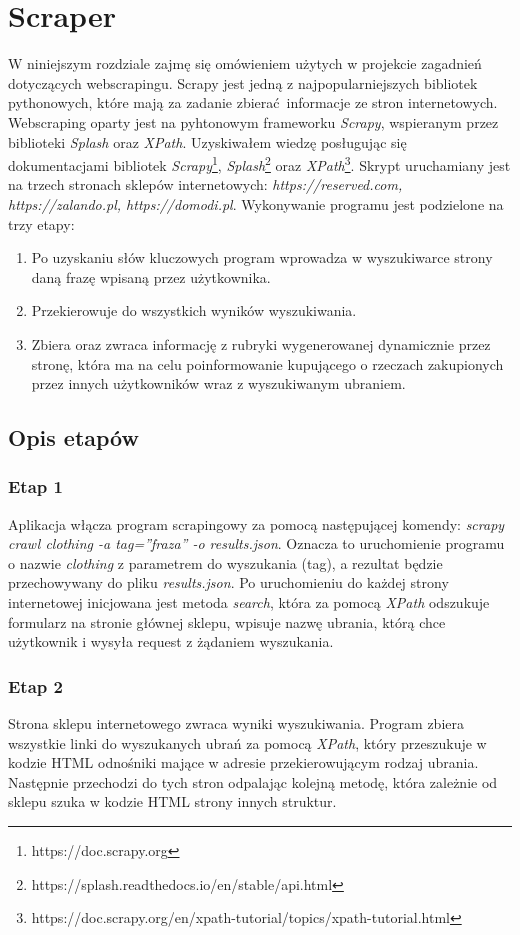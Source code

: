 \chapter {Scraper} 
W niniejszym rozdziale zajmę się omówieniem użytych w projekcie zagadnień dotyczących webscrapingu.
Scrapy jest jedną z najpopularniejszych bibliotek pythonowych, które mają za zadanie zbierać informacje ze stron internetowych.
Webscraping oparty jest na pyhtonowym frameworku \emph{Scrapy}, wspieranym przez biblioteki \emph{Splash} oraz \emph{XPath}.
Uzyskiwałem wiedzę posługując się dokumentacjami bibliotek \emph{Scrapy}\footnote{https://doc.scrapy.org}, \emph{Splash}\footnote{https://splash.readthedocs.io/en/stable/api.html} oraz \emph{XPath}\footnote{https://doc.scrapy.org/en/xpath-tutorial/topics/xpath-tutorial.html}.
Skrypt uruchamiany jest na trzech stronach sklepów internetowych: \emph{https://reserved.com, https://zalando.pl, https://domodi.pl}. 
Wykonywanie programu jest podzielone na trzy etapy:
\begin{enumerate}
	\item Po uzyskaniu słów kluczowych program wprowadza w wyszukiwarce strony daną frazę wpisaną przez użytkownika.
	\item Przekierowuje do wszystkich wyników wyszukiwania.
	\item Zbiera oraz zwraca informację z rubryki wygenerowanej dynamicznie przez stronę, która 	ma na celu poinformowanie kupującego o rzeczach zakupionych przez innych 	użytkowników wraz z wyszukiwanym ubraniem.
\end{enumerate}
\section{Opis etapów}

\subsection{Etap 1}
	Aplikacja włącza program scrapingowy za pomocą następującej komendy: \emph{scrapy crawl clothing -a tag=”fraza” -o results.json}.
Oznacza to uruchomienie programu o nazwie \emph{clothing} z parametrem do wyszukania (tag), a rezultat będzie przechowywany do pliku \emph{results.json}.
Po uruchomieniu do każdej strony internetowej inicjowana jest metoda \emph{search}, która za pomocą \emph{XPath} odszukuje formularz na stronie głównej sklepu, wpisuje nazwę ubrania, którą chce użytkownik i wysyła request z żądaniem wyszukania.

\subsection{Etap 2}
	Strona sklepu internetowego zwraca wyniki wyszukiwania. Program zbiera wszystkie linki do wyszukanych ubrań za pomocą \emph{XPath}, który przeszukuje w kodzie HTML odnośniki mające w adresie przekierowującym rodzaj ubrania. Następnie przechodzi do tych stron odpalając kolejną metodę, która zależnie od sklepu szuka w kodzie HTML strony innych struktur.

